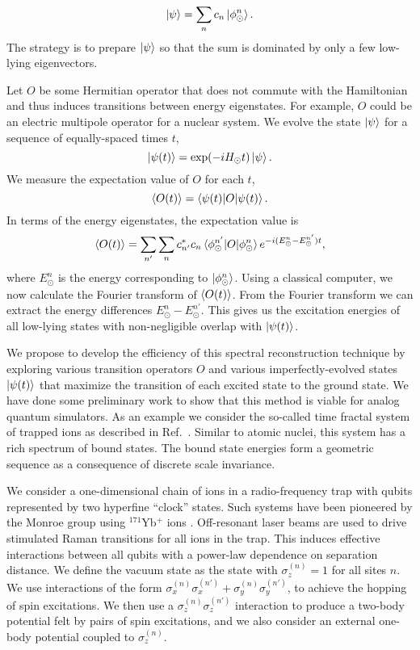 \documentclass[11pt]{article}
\begin{document}
\begin{equation}
\ket{\psi} = \sum_n c_n \ket{\phi^n_\odot}.
\end{equation}The strategy is to prepare $\ket{\psi}$ so that the sum is dominated by only a few low-lying eigenvectors. 



Let $O$ be some Hermitian operator that does not commute with the Hamiltonian and thus induces  transitions between energy eigenstates.  For example, $O$ could be an electric multipole operator for a nuclear system. We evolve the state $\ket{\psi}$ for a sequence of equally-spaced times $t$,
\begin{equation}
\ket{\psi(t)} = \exp(-iH_{\odot}t) \ket{\psi}.
\end{equation}
We measure the expectation value of $O$ for each $t$, 
\begin{equation}
\braket{O(t)} = \braket{\psi(t)| O |\psi(t)}. 
\end{equation}
In terms of the energy eigenstates, the expectation value is 
\begin{equation}
\braket{O(t)} =   \sum_{n'}  \sum_n c^*_{n'} c_n \braket{\phi^{n'}_\odot|O|\phi^n_\odot}
e^{-i(E^{n}_\odot-E^{n'}_\odot)t},
\end{equation}
where $E^{n}_\odot$ is the energy corresponding to
$\ket{\phi^n_\odot}$.  Using a classical computer, we now calculate
the Fourier transform of $\braket{O(t)}$.  From the Fourier transform
we can extract the energy differences $E^{n}_\odot-E^{n'}_\odot$.
This gives us the excitation energies of all low-lying states with
non-negligible overlap with $\ket{\psi(t)}$.

We propose to develop the efficiency of this spectral reconstruction
technique by exploring various transition operators $O$ and various
imperfectly-evolved states $\ket{\psi(t)}$ that maximize the
transition of each excited state to the ground state.  We have done
some preliminary work to show that this method is viable for analog
quantum simulators.  As an example we consider the so-called time
fractal system of trapped ions as described in
Ref.~\cite{Lee:2019gtc}.  Similar to atomic nuclei, this system has a
rich spectrum of bound states.  The bound state energies form a
geometric sequence as a consequence of discrete scale invariance.


We consider a one-dimensional chain of ions in a radio-frequency trap
with qubits represented by two hyperfine ``clock'' states.  Such
systems have been pioneered by the Monroe group using $^{171}$Yb$^{+}$
ions \cite{Zhang:2017a,Zhang:2017b}.  Off-resonant laser beams are
used to drive stimulated Raman transitions for all ions in the trap.
This induces effective interactions between all qubits with a
power-law dependence on separation distance.  We define the vacuum
state as the state with $\sigma_z^{(n)}=1$ for all sites $n$.  We use
interactions of the form
$\sigma_x^{(n)}\sigma_x^{(n')}+\sigma_y^{(n)}\sigma_y^{(n')}$, to
achieve the hopping of spin excitations.  We then use a
$\sigma_z^{(n)}\sigma_z^{(n')}$ interaction to produce a two-body
potential felt by pairs of spin excitations, and we also consider an
external one-body potential coupled to $\sigma_z^{(n)}$.
\end{document}
